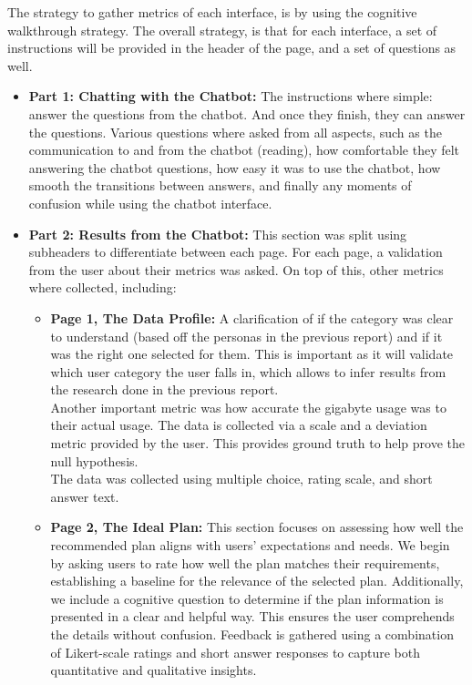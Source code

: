 \documentclass[conference]{IEEEtran}
\begin{document}
The strategy to gather metrics of each interface, is by using the cognitive walkthrough strategy. The overall strategy, is that for each interface, a set of instructions will be provided in the header of the page, and a set of questions as well. 
\begin{itemize}
    \item \textbf{Part 1: Chatting with the Chatbot:} The instructions where simple: answer the questions from the chatbot. And once they finish, they can answer the questions. Various questions where asked from all aspects, such as the communication to and from the chatbot (reading), how comfortable they felt answering the chatbot questions, how easy it was to use the chatbot, how smooth the transitions between answers, and finally any moments of confusion while using the chatbot interface.
    \item \textbf{Part 2: Results from the Chatbot:} This section was split using subheaders to differentiate between each page. For each page, a validation from the user about their metrics was asked. On top of this, other metrics where collected, including:
    \begin{itemize}
        \item \textbf{Page 1, The Data Profile:} A clarification of if the category was clear to understand (based off the personas in the previous report) and if it was the right one selected for them. This is important as it will validate which user category the user falls in, which allows to infer results from the research done in the previous report. \\
        Another important metric was how accurate the gigabyte usage was to their actual usage. The data is collected via a scale and a deviation metric provided by the user. This provides ground truth to help prove the null hypothesis.\\
        The data was collected using multiple choice, rating scale, and short answer text.
        \item \textbf{Page 2, The Ideal Plan:} This section focuses on assessing how well the recommended plan aligns with users' expectations and needs. We begin by asking users to rate how well the plan matches their requirements, establishing a baseline for the relevance of the selected plan. Additionally, we include a cognitive question to determine if the plan information is presented in a clear and helpful way. This ensures the user comprehends the details without confusion. Feedback is gathered using a combination of Likert-scale ratings and short answer responses to capture both quantitative and qualitative insights.

\end{itemize}
\end{itemize}
\end{document}
